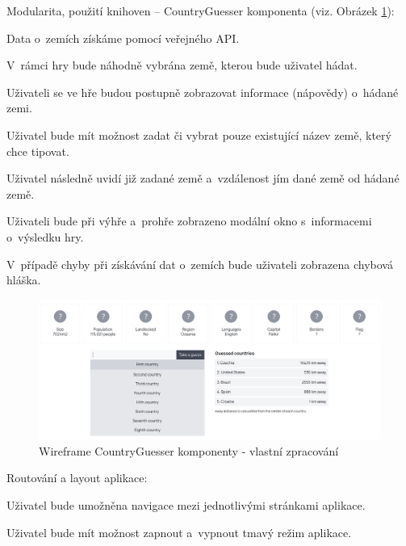 \begin{citemize}
	\item Modularita, použití knihoven -- CountryGuesser komponenta (viz. Obrázek \ref{fig:countryguesserwireframe}):
	
	\begin{cenumerate}
		\item Data o~zemích získáme pomocí veřejného API.
		\item V~rámci hry bude náhodně vybrána země, kterou bude uživatel hádat.
		\item Uživateli se ve hře budou postupně zobrazovat informace (nápovědy) o~hádané zemi.
		\item Uživatel bude mít možnost zadat či vybrat pouze existující název země, který chce tipovat.
		\item Uživatel následně uvidí již zadané země a~vzdálenost jím dané země od hádané země.
		\item Uživateli bude při výhře a~prohře zobrazeno modální okno s~informacemi o~výsledku hry.
		\item V~případě chyby při získávání dat o~zemích bude uživateli zobrazena chybová hláška.
	\end{cenumerate}

	\begin{figure}[htb]
		\centering
			\includegraphics[width=1\textwidth]{images/CountryGuesser-wireframe.png}
		\caption[Wireframe CountryGuesser komponenty]{Wireframe CountryGuesser komponenty - vlastní zpracování}
		\label{fig:countryguesserwireframe}
	\end{figure}

	\item Routování a layout aplikace:
	
	\begin{cenumerate}
		\item Uživatel bude umožněna navigace mezi jednotlivými stránkami aplikace.
		\item Uživatel bude mít možnost zapnout a~vypnout tmavý režim aplikace.
	\end{cenumerate}
\end{citemize}

